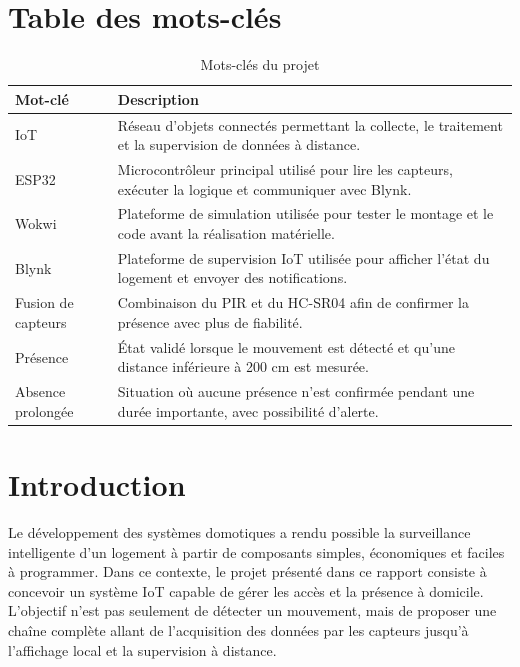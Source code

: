 \documentclass[12pt,a4paper]{report}
\begin{document}
\chapter*{Table des mots-clés}
\begin{table}[H]
  \centering
  \caption{Mots-clés du projet}
  \begin{tabular}{p{4cm}p{10cm}}
    \toprule
    \rowcolor{TableHead}
    \textbf{Mot-clé} & \textbf{Description} \\
    \midrule
    IoT & Réseau d'objets connectés permettant la collecte, le traitement et la supervision de données à distance. \\
    ESP32 & Microcontrôleur principal utilisé pour lire les capteurs, exécuter la logique et communiquer avec Blynk. \\
    Wokwi & Plateforme de simulation utilisée pour tester le montage et le code avant la réalisation matérielle. \\
    Blynk & Plateforme de supervision IoT utilisée pour afficher l'état du logement et envoyer des notifications. \\
    Fusion de capteurs & Combinaison du PIR et du HC-SR04 afin de confirmer la présence avec plus de fiabilité. \\
    Présence & État validé lorsque le mouvement est détecté et qu'une distance inférieure à 200 cm est mesurée. \\
    Absence prolongée & Situation où aucune présence n'est confirmée pendant une durée importante, avec possibilité d'alerte. \\
    \bottomrule
  \end{tabular}
\end{table}

\clearpage
{}

\chapter*{Introduction}
Le développement des systèmes domotiques a rendu possible la surveillance intelligente d'un logement à partir de composants simples, économiques et faciles à programmer. Dans ce contexte, le projet présenté dans ce rapport consiste à concevoir un système IoT capable de gérer les accès et la présence à domicile. L'objectif n'est pas seulement de détecter un mouvement, mais de proposer une chaîne complète allant de l'acquisition des données par les capteurs jusqu'à l'affichage local et la supervision à distance.
\end{document}

